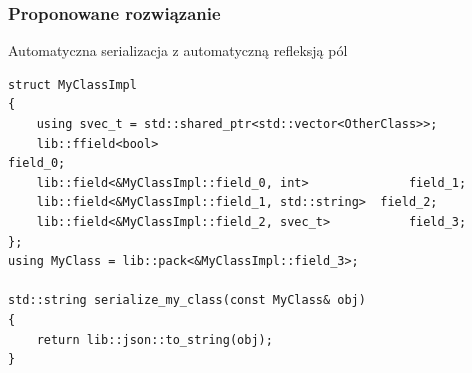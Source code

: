 \documentclass[12pt]{beamer}
\begin{document}
	\begin{frame}[fragile]
		\frametitle{Proponowane rozwiązanie}

		Automatyczna serializacja z automatyczną refleksją pól\newline

		\begin{lstlisting}[frame=single]
struct MyClassImpl
{
	using svec_t = std::shared_ptr<std::vector<OtherClass>>;
	lib::ffield<bool>											field_0;
	lib::field<&MyClassImpl::field_0, int>				field_1;
	lib::field<&MyClassImpl::field_1, std::string> 	field_2;
	lib::field<&MyClassImpl::field_2, svec_t>			field_3;
};
using MyClass = lib::pack<&MyClassImpl::field_3>;

std::string serialize_my_class(const MyClass& obj)
{
	return lib::json::to_string(obj);
}
		\end{lstlisting}

	\end{frame}
\end{document}
